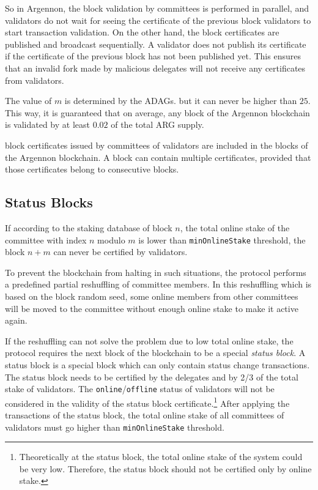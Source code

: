 So in Argennon, the block validation by committees is performed in parallel, and validators
do not wait for seeing the certificate of the previous block validators to start transaction validation. On the
other hand, the block certificates are published and broadcast sequentially. A validator does not publish its
certificate if the certificate of the previous block has not been published yet. This ensures that an invalid
fork made by malicious delegates will not receive any certificates from validators.

The value of $m$ is determined by the ADAGs. but it can never be higher than $25$. This way, it is guaranteed
that on average, any block of the Argennon blockchain is validated by at least $0.02$ of the total ARG supply.

block certificates issued by committees of validators are included in the blocks of the Argennon blockchain.
A block can contain multiple certificates, provided that
those certificates belong to consecutive blocks.

\subsection{Status Blocks}\label{subsec:status-blocks}

If according to the staking database of block $n$, the total online stake of the committee with index $n$ modulo $m$ is
lower than \texttt{minOnlineStake} threshold, the block $n + m$ can never be certified by validators.

To prevent the blockchain from halting in such situations, the protocol performs a predefined partial
reshuffling of committee members.
In this reshuffling which is based on the block random seed, some online members from other committees will
be moved to the committee without enough online stake to make it active again.

If the reshuffling can not solve the problem due to low total online stake, the protocol requires the next block
of the blockchain to be a special \emph{status block}. A status block is a special block which can only contain
status change transactions. The status block needs to be certified by the delegates and by 2/3 of the total stake of
validators. The \texttt{online}/\texttt{offline} status of validators will not be considered in the validity of
the status block certificate.\footnote{Theoretically at the status block, the total online stake of the system could
be very low. Therefore, the status block should not be certified only by online stake.} After applying
the transactions of the status block, the total online stake of all committees of validators
must go higher than \texttt{minOnlineStake} threshold.

